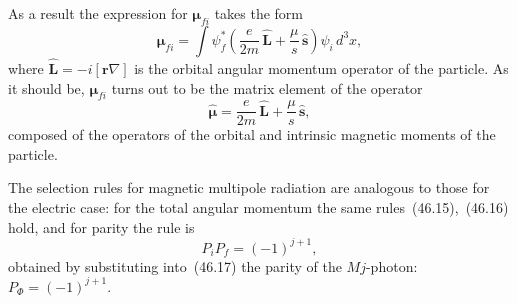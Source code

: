 As a result the expression for $\boldsymbol{\mu}_{fi}$ takes the form
\begin{equation}
\boldsymbol{\mu}_{fi} = \int\psi^*_f\!\left(\frac{e}{2m}\,\widehat{\mathbf{L}} + \frac{\mu}{s}\,\widehat{\mathbf{s}}\right)\psi_i\,d^3x,
\tag{47.8}
\end{equation}
where $\widehat{\mathbf{L}} = -i[\mathbf{r}\nabla]$ is the orbital angular momentum operator of the particle. As it should be, $\boldsymbol{\mu}_{fi}$ turns out to be the matrix element of the operator
\begin{equation}
\widehat{\boldsymbol{\mu}} = \frac{e}{2m}\,\widehat{\mathbf{L}} + \frac{\mu}{s}\,\widehat{\mathbf{s}},
\tag{47.9}
\end{equation}
composed of the operators of the orbital and intrinsic magnetic moments of the particle.

The selection rules for magnetic multipole radiation are analogous to those for the electric case: for the total angular momentum the same rules~(46.15),~(46.16) hold, and for parity the rule is
\begin{equation}
P_i P_f = (-1)^{j+1},
\tag{47.10}
\end{equation}
obtained by substituting into~(46.17) the parity of the $Mj$-photon: $P_\Phi = (-1)^{j+1}$.
